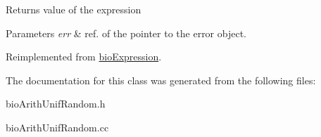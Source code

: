 \begin{DoxyReturn}{Returns}
value of the expression 
\end{DoxyReturn}

\begin{DoxyParams}{Parameters}
{\em err} & ref. of the pointer to the error object. \\
\hline
\end{DoxyParams}


Reimplemented from \hyperlink{classbio_expression_af58662a5d4d456f15bc4f2c9bd4f8a5b}{bio\+Expression}.



The documentation for this class was generated from the following files\+:\begin{DoxyCompactItemize}
\item 
bio\+Arith\+Unif\+Random.\+h\item 
bio\+Arith\+Unif\+Random.\+cc\end{DoxyCompactItemize}
